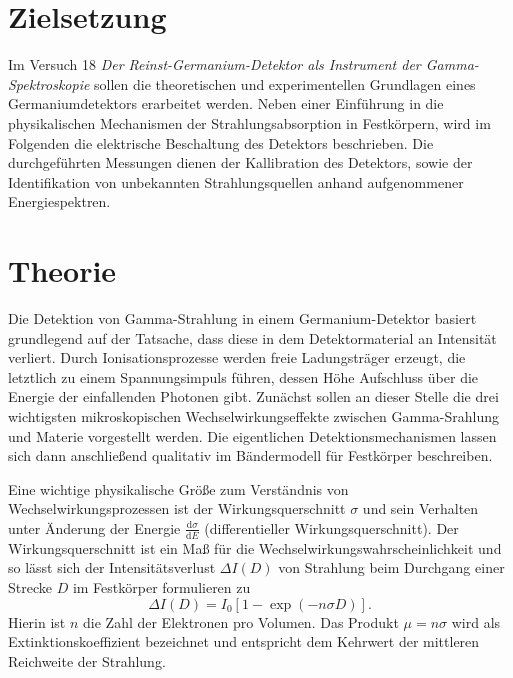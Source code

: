 \setcounter{page}{1}
\section*{Zielsetzung}
Im Versuch 18 \textit{Der Reinst-Germanium-Detektor als
Instrument der Gamma-Spektroskopie} sollen die theoretischen und experimentellen Grundlagen eines
Germaniumdetektors erarbeitet werden. Neben einer Einführung in die physikalischen Mechanismen der
Strahlungsabsorption in Festkörpern, wird im Folgenden die elektrische Beschaltung des Detektors beschrieben.
Die durchgeführten Messungen dienen der Kallibration des Detektors, sowie der Identifikation von unbekannten
Strahlungsquellen anhand aufgenommener Energiespektren. 

\section{Theorie}
Die Detektion von Gamma-Strahlung in einem Germanium-Detektor basiert grundlegend auf der Tatsache, dass diese in dem
Detektormaterial an Intensität verliert. Durch Ionisationsprozesse werden freie Ladungsträger erzeugt, die letztlich
zu einem Spannungsimpuls führen, dessen Höhe Aufschluss über die Energie der einfallenden Photonen gibt.
Zunächst sollen an dieser Stelle die drei wichtigsten mikroskopischen Wechselwirkungseffekte zwischen Gamma-Srahlung und
Materie vorgestellt werden. Die eigentlichen Detektionsmechanismen lassen sich dann anschließend qualitativ im
Bändermodell für Festkörper beschreiben.

Eine wichtige physikalische
Größe zum Verständnis von Wechselwirkungsprozessen ist der Wirkungsquerschnitt $\sigma$ und sein Verhalten unter
Änderung der Energie $\frac{\mathup{d}\sigma}{\mathup{d}E}$ (differentieller Wirkungsquerschnitt). Der Wirkungsquerschnitt
ist ein Maß für die Wechselwirkungswahrscheinlichkeit und so lässt sich der Intensitätsverlust $\Delta I(D)$ von Strahlung beim Durchgang einer
Strecke $D$ im Festkörper formulieren zu
\begin{equation}
    \Delta I(D) = I_0 \left[1 -  \exp\left(- n \sigma D\right)\right].
\end{equation}
Hierin ist $n$ die Zahl der Elektronen pro Volumen. Das Produkt $\mu = n \sigma$ wird als Extinktionskoeffizient
bezeichnet und entspricht dem Kehrwert der mittleren Reichweite der Strahlung.


